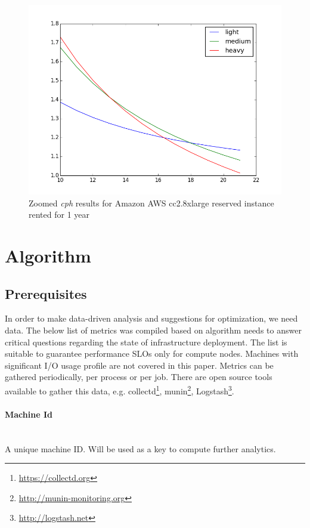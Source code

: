 \documentclass[]{final_report}
\newcommand{\myparagraph}[1]{\paragraph{#1}\mbox{}\\}
\begin{document}
\begin{figure}[H]
	\includegraphics[width=\linewidth]{figures/cph_cc2_8xlarge_zoom}
	\caption{Zoomed \textit{cph} results for Amazon AWS cc2.8xlarge reserved instance rented for 1 year~\cite{AWS:light}~\cite{AWS:medium}~\cite{AWS:heavy}}
	\label{fig:cph_cc2_8xlarge_zoom}
\end{figure}


\section{Algorithm}

\subsection{Prerequisites} 

In order to make data-driven analysis and suggestions for optimization, we need data. The below list of metrics was compiled based on algorithm needs to answer critical questions regarding the state of infrastructure deployment. The list is suitable to guarantee performance SLOs only for compute nodes. Machines with significant I/O usage profile are not covered in this paper. 
Metrics can be gathered periodically, per process or per job. There are open source tools available to gather this data, e.g. collectd\footnote{\url{https://collectd.org}}, munin\footnote{\url{http://munin-monitoring.org}}, Logstash\footnote{\url{http://logstash.net}}.

\myparagraph{Machine Id}
A unique machine ID. Will be used as a key to compute further analytics.
\end{document}
